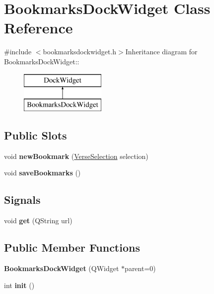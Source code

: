 \hypertarget{classBookmarksDockWidget}{
\section{BookmarksDockWidget Class Reference}
\label{classBookmarksDockWidget}
}


{\ttfamily \#include $<$bookmarksdockwidget.h$>$}Inheritance diagram for BookmarksDockWidget::\begin{figure}[H]
\begin{center}
\leavevmode
\includegraphics[height=2cm]{classBookmarksDockWidget}
\end{center}
\end{figure}
\subsection*{Public Slots}
\begin{DoxyCompactItemize}
\item 
\hypertarget{classBookmarksDockWidget_a641a58df04e7c420e13211e6478ff6a2}{
void {\bfseries newBookmark} (\hyperlink{classVerseSelection}{VerseSelection} selection)}
\label{classBookmarksDockWidget_a641a58df04e7c420e13211e6478ff6a2}

\item 
\hypertarget{classBookmarksDockWidget_a33e94305656eb55eb0c29f7279d00e8c}{
void {\bfseries saveBookmarks} ()}
\label{classBookmarksDockWidget_a33e94305656eb55eb0c29f7279d00e8c}

\end{DoxyCompactItemize}
\subsection*{Signals}
\begin{DoxyCompactItemize}
\item 
\hypertarget{classBookmarksDockWidget_a9891888ad26043df89a56f9c7fc6c753}{
void {\bfseries get} (QString url)}
\label{classBookmarksDockWidget_a9891888ad26043df89a56f9c7fc6c753}

\end{DoxyCompactItemize}
\subsection*{Public Member Functions}
\begin{DoxyCompactItemize}
\item 
\hypertarget{classBookmarksDockWidget_a0e8922229b7f74f463de678899e6f33f}{
{\bfseries BookmarksDockWidget} (QWidget $\ast$parent=0)}
\label{classBookmarksDockWidget_a0e8922229b7f74f463de678899e6f33f}

\item 
\hypertarget{classBookmarksDockWidget_ad36126321cba613671667ebc64de8fe3}{
int {\bfseries init} ()}
\label{classBookmarksDockWidget_ad36126321cba613671667ebc64de8fe3}

\end{DoxyCompactItemize}
